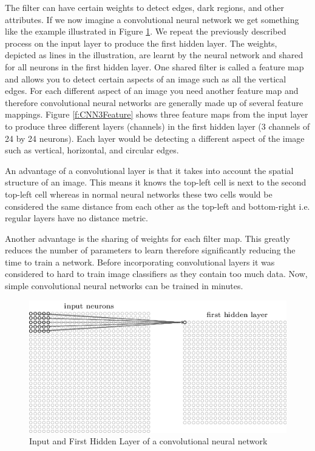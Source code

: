\documentclass{bhamthesis}
\theoremstyle{definition}
\begin{document}
The filter can have certain weights to detect edges, dark regions, and other attributes. If we now imagine a convolutional neural network we get something like the example illustrated in Figure \ref{f:CNNInput}. We repeat the previously described process on the input layer to produce the first hidden layer. The weights, depicted as lines in the illustration, are learnt by the neural network and shared for all neurons in the first hidden layer. One shared filter is called a feature map and allows you to detect certain aspects of an image such as all the vertical edges. For each different aspect of an image you need another feature map and therefore convolutional neural networks are generally made up of several feature mappings. Figure \ref{f:CNN3Feature} shows three feature maps from the input layer to produce three different layers (channels) in the first hidden layer (3 channels of 24 by 24 neurons). Each layer would be detecting a different aspect of the image such as vertical, horizontal, and circular edges.

An advantage of a convolutional layer is that it takes into account the spatial structure of an image. This means it knows the top-left cell is next to the second top-left cell whereas in normal neural networks these two cells would be considered the same distance from each other as the top-left and bottom-right i.e. regular layers have no distance metric.

Another advantage is the sharing of weights for each filter map. This greatly reduces the number of parameters to learn therefore significantly reducing the time to train a network. Before incorporating convolutional layers it was considered to hard to train image classifiers as they contain too much data. Now, simple convolutional neural networks can be trained in minutes.

\begin{figure}
	\includegraphics[width=\textwidth]{media/img/cnnInputAndHidden}
	\caption{Input and First Hidden Layer of a convolutional neural network \cite{Neilsen2015}}\label{f:CNNInput}
\end{figure}
\end{document}
